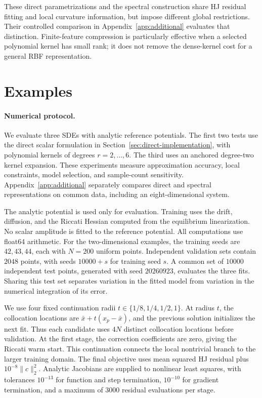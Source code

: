 \documentclass[11pt]{article}
\theoremstyle{plain}      %
\theoremstyle{definition} %
\begin{document}
These direct parametrizations and the spectral construction share HJ residual fitting and local curvature information, but impose different global restrictions. Their controlled comparison in Appendix~\ref{app:additional} evaluates that distinction. Finite-feature compression is particularly effective when a selected polynomial kernel has small rank; it does not remove the dense-kernel cost for a general RBF representation.

\section{Examples}\label{examples}
\paragraph{Numerical protocol.}\label{sec:numerical-scope}
We evaluate three SDEs with analytic reference potentials. The first two tests use the direct scalar formulation in Section~\ref{sec:direct-implementation}, with polynomial kernels of degrees $r=2,\ldots,6$. The third uses an anchored degree-two kernel expansion. These experiments measure approximation accuracy, local constraints, model selection, and sample-count sensitivity. Appendix~\ref{app:additional} separately compares direct and spectral representations on common data, including an eight-dimensional system.

The analytic potential is used only for evaluation. Training uses the drift, diffusion, and the Riccati Hessian computed from the equilibrium linearization. No scalar amplitude is fitted to the reference potential. All computations use float64 arithmetic. For the two-dimensional examples, the training seeds are $42,43,44$, each with $N=200$ uniform points. Independent validation sets contain $2048$ points, with seeds $10000+s$ for training seed $s$. A common set of $10000$ independent test points, generated with seed $20260923$, evaluates the three fits. Sharing this test set separates variation in the fitted model from variation in the numerical integration of its error.

We use four fixed continuation radii $t\in\{1/8,1/4,1/2,1\}$. At radius $t$, the collocation locations are $\bar x+t(x_p-\bar x)$, and the previous solution initializes the next fit. Thus each candidate uses $4N$ distinct collocation locations before validation. At the first stage, the correction coefficients are zero, giving the Riccati warm start. This continuation connects the local nontrivial branch to the larger training domain. The final objective uses mean squared HJ residual plus $10^{-8}\|c\|_2^2$. Analytic Jacobians are supplied to nonlinear least squares, with tolerances $10^{-13}$ for function and step termination, $10^{-10}$ for gradient termination, and a maximum of $3000$ residual evaluations per stage.
\end{document}
